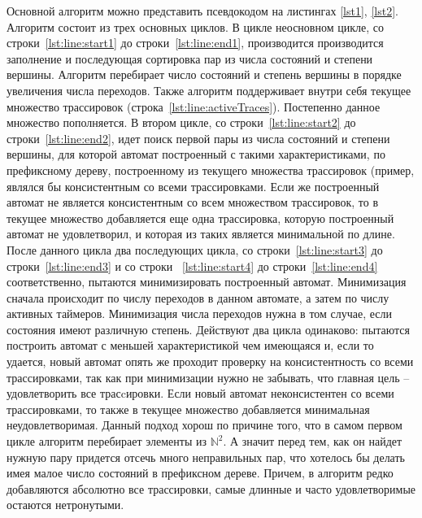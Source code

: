 \documentclass[times,specification,annotation]{itmo-student-thesis}
\begin{document}
Основной алгоритм можно представить псевдокодом на листингах \ref{lst1}, \ref{lst2}. 
Алгоритм состоит из трех основных циклов. В цикле неосновном цикле, со строки~\ref{lst:line:start1} до строки~\ref{lst:line:end1}, производится производится заполнение и последующая сортировка
пар из числа состояний и степени вершины. Алгоритм перебирает число состояний и степень вершины в порядке увеличения числа переходов. 
Также алгоритм поддерживает внутри себя текущее множество трассировок (строка~\ref{lst:line:activeTraces}). Постепенно данное множество пополняется.
В втором цикле, со строки~\ref{lst:line:start2} до строки~\ref{lst:line:end2}, идет поиск первой пары из числа состояний и степени вершины,
для которой автомат построенный с такими характеристиками, по префиксному дереву, построенному из текущего множества трассировок (пример,
являлся бы консистентным со всеми трассировками. Если же построенный автомат не является консистентным со
всем множеством трассировок, то в текущее множество добавляется еще одна трассировка, которую построенный автомат не удовлетворил, и которая из таких является минимальной по длине.
После данного цикла два последующих цикла, со строки~\ref{lst:line:start3} до строки~\ref{lst:line:end3} и со строки ~\ref{lst:line:start4} до строки~\ref{lst:line:end4} соответственно,
пытаются минимизировать построенный автомат. Минимизация сначала происходит по числу переходов в данном автомате, а затем по числу активных таймеров.
Минимизация числа переходов нужна в том случае, если состояния имеют различную степень. Действуют два цикла одинаково: пытаются построить автомат с меньшей характеристикой чем имеющаяся и,
если то удается, новый автомат опять же проходит проверку на консистентность со всеми трассировками, так как при минимизации нужно не забывать, что главная цель -- удовлетворить все трасcировки.
Если новый автомат неконсистентен со всеми трассировками, то также в текущее множество добавляется минимальная неудовлетворимая. Данный подход хорош по причине того, что
в самом первом цикле алгоритм перебирает элементы из $\mathbb{N}^2$. А значит перед тем, как он найдет нужную пару придется отсечь много неправильных пар, что хотелось бы делать имея малое число
состояний в префиксном дереве. Причем, в алгоритм редко добавляются абсолютно все трассировки, самые длинные и часто удовлетворимые остаются нетронутыми.
\end{document}
